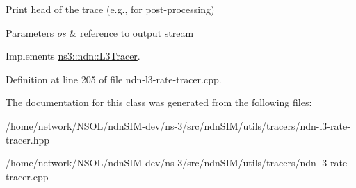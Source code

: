 Print head of the trace (e.\+g., for post-\/processing) 


\begin{DoxyParams}{Parameters}
{\em os} & reference to output stream \\
\hline
\end{DoxyParams}


Implements \hyperlink{classns3_1_1ndn_1_1L3Tracer_a899a814836ce179c610c469a7f3889e4}{ns3\+::ndn\+::\+L3\+Tracer}.



Definition at line 205 of file ndn-\/l3-\/rate-\/tracer.\+cpp.



The documentation for this class was generated from the following files\+:\begin{DoxyCompactItemize}
\item 
/home/network/\+N\+S\+O\+L/ndn\+S\+I\+M-\/dev/ns-\/3/src/ndn\+S\+I\+M/utils/tracers/ndn-\/l3-\/rate-\/tracer.\+hpp\item 
/home/network/\+N\+S\+O\+L/ndn\+S\+I\+M-\/dev/ns-\/3/src/ndn\+S\+I\+M/utils/tracers/ndn-\/l3-\/rate-\/tracer.\+cpp\end{DoxyCompactItemize}
